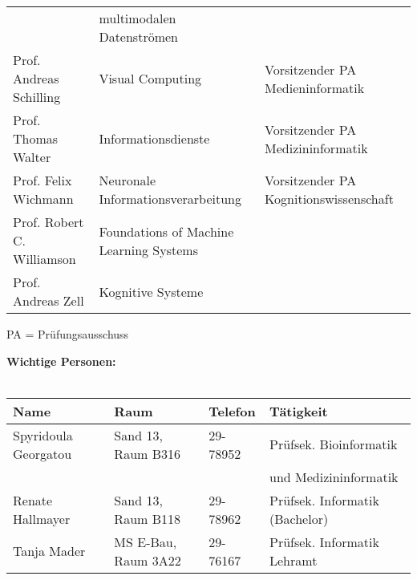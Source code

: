 \begin{tabular}{|lll|}
	                                 & multimodalen Datenströmen                             &                                          \\
	Prof. Andreas Schilling          & Visual Computing                                      & Vorsitzender PA Medieninformatik         \\
	Prof. Thomas Walter              & Informationsdienste                                   & Vorsitzender PA Medizininformatik        \\
	Prof. Felix Wichmann             & Neuronale Informationsverarbeitung                    & Vorsitzender PA Kognitionswissenschaft   \\
	Prof. Robert C. Williamson       & Foundations of Machine Learning Systems               &                                          \\
	Prof. Andreas Zell               & Kognitive Systeme                                     &                                          \\
	\hline
\end{tabular}
\scriptsize{PA = Prüfungsausschuss}


\textbf{Wichtige Personen:}\\\\
\begin{tabular}{|llll|}
	\hline
	Name								 & Raum                & Telefon  & Tätigkeit \hfill               \\
	\hline
	\hline
	Spyridoula Georgatou & Sand 13, Raum B316  & 29-78952 & Prüfsek. Bioinformatik         \\
											 &                     &          & und Medizininformatik          \\
	Renate Hallmayer		 & Sand 13, Raum B118  & 29-78962 & Prüfsek. Informatik (Bachelor) \\
	Tanja Mader					 & MS E-Bau, Raum 3A22 & 29-76167 & Prüfsek. Informatik Lehramt    \\
	\hline
\end{tabular} \\

